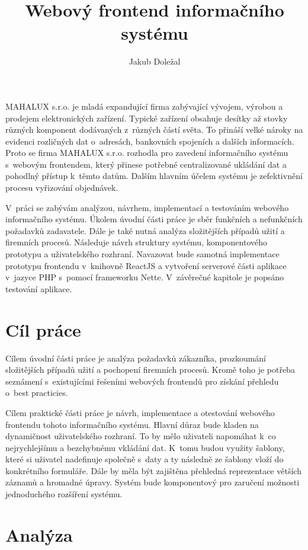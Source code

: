 \documentclass[thesis=B,czech]{FITthesis}[2012/06/26]
\title{Webový frontend informačního systému}
\author{Jakub Doležal} %
\begin{document}

\begin{introduction}
	MAHALUX s.r.o. je mladá expandující firma zabývající vývojem, výrobou a prodejem elektronických zařízení. Typické zařízení obsahuje desítky až stovky různých komponent dodávaných z~různých částí světa. To přináší velké nároky na evidenci rozličných dat o~adresách, bankovních spojeních a dalších informacích. Proto se firma MAHALUX s.r.o. rozhodla pro zavedení informačního systému s~webovým frontendem, který přinese potřebné centralizované ukládání dat a pohodlný přístup k~těmto datům. Dalším hlavním účelem systému je zefektivnění procesu vyřizování objednávek.
	
	V~práci se zabývám analýzou, návrhem, implementací a testováním webového informačního systému.
	Úkolem úvodní části práce je sběr funkčních a nefunkčních požadavků zadavatele. Dále je také nutná analýza složitějších případů užití a firemních procesů. Následuje návrh struktury systému, komponentového prototypu a uživatelského rozhraní. Navazovat bude samotná implementace prototypu frontendu v~knihovně ReactJS a vytvoření serverové části aplikace v~jazyce PHP s~pomocí frameworku Nette. V~závěrečné kapitole je popsáno testování aplikace.
\end{introduction}

\chapter{Cíl práce}
	Cílem úvodní části práce je analýza požadavků zákazníka, prozkoumání složitějších případů užití a pochopení firemních procesů. Kromě toho je potřeba seznámení s~existujícími řešeními webových frontendů pro získání přehledu o~best practicies.
	
	Cílem praktické části práce je návrh, implementace a otestování webového frontendu tohoto informačního systému. Hlavní důraz bude kladen na dynamičnost uživatelského rozhraní. To by mělo uživateli napomáhat k~co nejrychlejšímu a bezchybnému vkládání dat. K~tomu budou využity šablony, které si uživatel nadefinuje společně s~daty a ty následně ze šablony vloží do konkrétního formuláře. Dále by měla být zajištěna přehledná reprezentace větších záznamů a hromadné úpravy. Systém bude komponentový pro zaručení možnosti jednoduchého rozšíření systému.
	
\chapter{Analýza}
\end{document}
